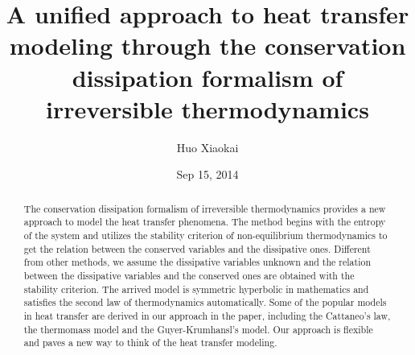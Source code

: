 \documentclass[a4paper]{article}
\title{A unified approach to heat transfer modeling through the conservation dissipation formalism of irreversible thermodynamics}
\author{Huo Xiaokai}
\date{Sep 15, 2014}
\begin{document}
\maketitle

\begin{abstract}
The conservation dissipation formalism of irreversible thermodynamics provides a new approach to model the heat transfer phenomena. The method begins with the entropy of the system and utilizes the stability criterion of non-equilibrium thermodynamics to get the relation between the conserved variables and the dissipative ones. Different from other methods, we assume the dissipative variables unknown and the relation between the dissipative variables and the conserved ones are obtained with the stability criterion. The arrived model is symmetric hyperbolic in mathematics and satisfies the second law of thermodynamics automatically. Some of the popular models in heat transfer are derived in our approach in the paper, including the Cattaneo's law, the thermomass model and the Guyer-Krumhansl's model. Our approach is flexible and paves a new way to think of the heat transfer modeling. 
\end{abstract}
\end{document}
